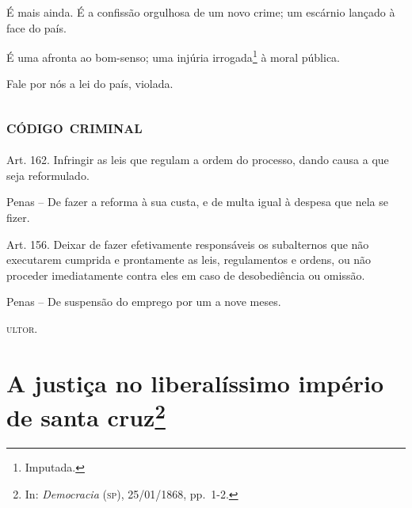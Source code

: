 É mais ainda. É a confissão orgulhosa de um novo crime; um escárnio
lançado à face do país.

É uma afronta ao bom-senso; uma injúria irrogada\footnote{Imputada.} à
moral pública.

Fale por nós a lei do país, violada.

\section{\textsc{código criminal}}

Art. 162. Infringir as leis que regulam a ordem do processo, dando causa
a que seja reformulado.

Penas -- De fazer a reforma à sua custa, e de multa igual à despesa que
nela se fizer.

Art. 156. Deixar de fazer efetivamente responsáveis os subalternos que
não executarem cumprida e prontamente as leis, regulamentos e ordens, ou
não proceder imediatamente contra eles em caso de desobediência ou
omissão.

Penas -- De suspensão do emprego por um a nove meses.

\textsc{ultor}.

\chapter{A justiça no liberalíssimo império de santa cruz\footnote{In:
  \emph{Democracia} (\textsc{sp}), 25/01/1868, pp.~1-2.}}

